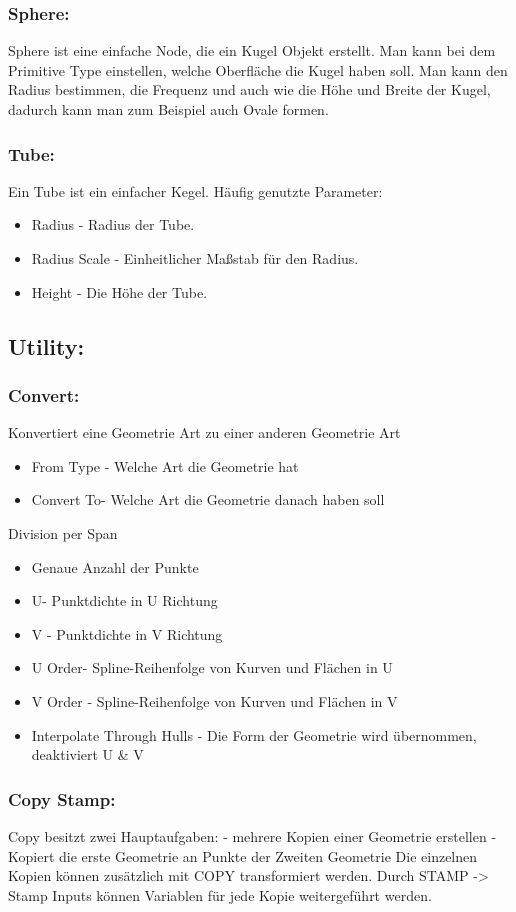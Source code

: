 \documentclass[paper=a4,fontsize=12pt,ngerman]{scrartcl}
\begin{document}
	\subsubsection*{Sphere:}
	Sphere ist eine einfache Node, die ein Kugel Objekt erstellt. Man kann bei dem Primitive Type einstellen, welche Oberfläche die Kugel haben soll. Man kann den Radius bestimmen, die Frequenz und auch wie die Höhe und Breite der Kugel, dadurch kann man zum Beispiel auch Ovale formen. 
	\subsubsection*{Tube:}
	Ein Tube ist ein einfacher Kegel. Häufig genutzte Parameter: 
	 	\begin{itemize}
	 		\item Radius - Radius der Tube. 
	 		\item Radius Scale - Einheitlicher Maßstab für den Radius. 
	 		\item Height - Die Höhe der Tube. 
	 	\end{itemize} 
	
	\subsection*{Utility:}
	\subsubsection*{Convert:}
	Konvertiert eine Geometrie Art zu einer anderen Geometrie Art
	\begin{itemize}
		\item From Type - Welche Art die Geometrie hat
		\item Convert To- Welche Art die Geometrie danach haben soll
	\end{itemize}
	Division per Span
	\begin{itemize}
		\item Genaue Anzahl der Punkte
		\item U- Punktdichte in U Richtung
		\item V - Punktdichte in V Richtung
		\item U Order- Spline-Reihenfolge von Kurven und Flächen in U
		\item V Order - Spline-Reihenfolge von Kurven und Flächen in V
		\item Interpolate Through Hulls - Die Form der Geometrie wird übernommen, deaktiviert U \& V
	\end{itemize}
	\subsubsection*{Copy Stamp:}
	Copy besitzt zwei Hauptaufgaben:
	- mehrere Kopien einer Geometrie erstellen
	- Kopiert die erste Geometrie an Punkte der Zweiten Geometrie
	Die einzelnen Kopien können zusätzlich mit COPY transformiert werden. 
	Durch STAMP -> Stamp Inputs können Variablen für jede Kopie weitergeführt werden. 
\end{document}
